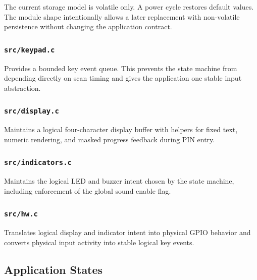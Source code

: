 \documentclass[11pt,a4paper]{article}
\begin{document}
The current storage model is volatile only. A power cycle restores default values. The module shape
intentionally allows a later replacement with non-volatile persistence without changing the application contract.

\subsubsection*{\texttt{src/keypad.c}}

Provides a bounded key event queue. This prevents the state machine from depending directly on scan
timing and gives the application one stable input abstraction.

\subsubsection*{\texttt{src/display.c}}

Maintains a logical four-character display buffer with helpers for fixed text, numeric rendering,
and masked progress feedback during PIN entry.

\subsubsection*{\texttt{src/indicators.c}}

Maintains the logical LED and buzzer intent chosen by the state machine, including enforcement of
the global sound enable flag.

\subsubsection*{\texttt{src/hw.c}}

Translates logical display and indicator intent into physical GPIO behavior and converts physical
input activity into stable logical key events.

\subsection{Application States}
\end{document}
